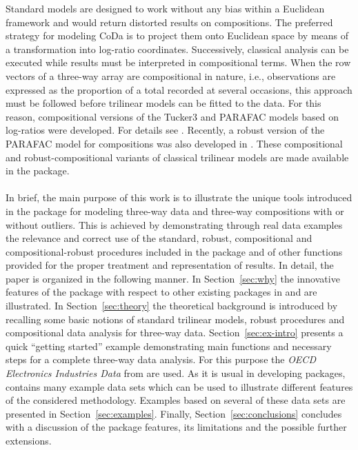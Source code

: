 \documentclass[article,shortnames, nojss]{jss}
\begin{document}
Standard models are designed to work without any bias within a Euclidean framework \citep{PawEgo,Bill01} and would return distorted results on compositions.
The preferred strategy for modeling CoDa is to project them onto Euclidean space by means of a transformation into log-ratio coordinates. Successively, classical analysis can be executed while results must  be interpreted in compositional terms.
When the row vectors of a three-way array are compositional in nature, i.e., observations are expressed as the proportion of a total recorded at several occasions, this approach must be followed before trilinear models can be fitted to the data. For this reason, compositional versions of the Tucker3 and PARAFAC models based on log-ratios were developed. For details see \citet{gallo:2015, gallo:2013, Engle13}. Recently, a robust version of the PARAFAC model for compositions was also developed in \citet{dipalma:2018}. These compositional and robust-compositional variants of classical trilinear models are made available in the  package. \\\\
In brief, the main purpose of this work is to illustrate the unique tools introduced in the  package  for modeling three-way data and three-way compositions with or without outliers. This is achieved by demonstrating through real data examples the relevance and correct use of the standard, robust, compositional and compositional-robust procedures included in the package and of other functions provided for the proper treatment and representation of results. In detail, the paper is organized in the following manner. In Section~\ref{sec:why} the innovative features of the  package with respect to other existing packages in  and  are illustrated. In Section~\ref{sec:theory} the theoretical background is introduced by recalling some basic notions of standard trilinear models, robust procedures and compositional data analysis for three-way data. Section~\ref{sec:ex-intro} presents a quick ``getting started'' example demonstrating main functions and necessary steps for a complete three-way data analysis. For this purpose the \emph{OECD Electronics Industries Data} from \citet{kroonenberg:2008} are used. As it is usual in developing  packages,  contains many example data sets which can be used to illustrate different features of the considered methodology. Examples based on several of these data sets are presented in Section~\ref{sec:examples}. Finally, Section~\ref{sec:conclusions} concludes with a  discussion of the package features, its limitations and the possible further extensions.
\end{document}
